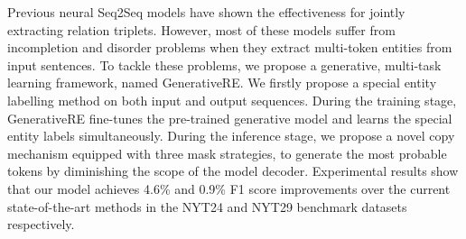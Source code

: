 Previous neural Seq2Seq models have shown the effectiveness for jointly extracting relation triplets. However, most of these models  suffer from incompletion and disorder problems when they extract multi-token entities from input sentences. To tackle these problems, we propose a generative, multi-task learning framework, named GenerativeRE. We firstly propose a special entity labelling method on both input and output sequences. During the training stage, GenerativeRE fine-tunes the pre-trained generative model and learns the special entity labels simultaneously. During the inference stage, we propose a novel copy mechanism equipped with three mask strategies, to generate the most probable tokens by diminishing the scope of the model decoder. Experimental results show that our model achieves 4.6\% and 0.9\% F1 score improvements over the current state-of-the-art methods in the NYT24 and NYT29 benchmark datasets respectively.
